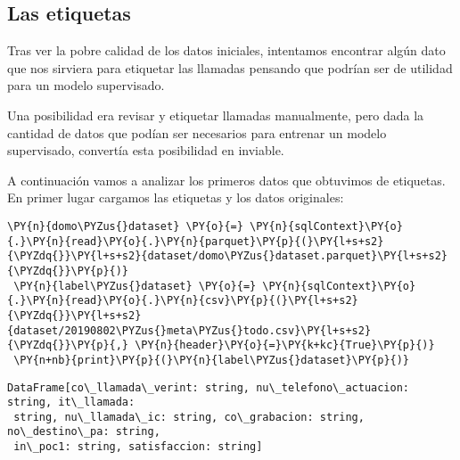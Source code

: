  
 \subsection{Las etiquetas}
 
 Tras ver la pobre calidad de los datos iniciales, intentamos encontrar algún dato que nos sirviera para etiquetar las llamadas pensando que podrían ser de utilidad para un modelo supervisado. 
 
 Una posibilidad era revisar y etiquetar llamadas manualmente, pero dada la cantidad de datos que podían ser necesarios para entrenar un modelo supervisado, convertía esta posibilidad en inviable.
 
 A continuación vamos a analizar los primeros datos que obtuvimos de etiquetas. En primer lugar cargamos las etiquetas y los datos originales:  
 \vspace{0.5cm}
 
   \begin{tcolorbox}[breakable, size=fbox, boxrule=1pt, pad at break*=1mm,colback=cellbackground, colframe=cellborder]
 \begin{Verbatim}[commandchars=\\\{\}]
 \PY{n}{domo\PYZus{}dataset} \PY{o}{=} \PY{n}{sqlContext}\PY{o}{.}\PY{n}{read}\PY{o}{.}\PY{n}{parquet}\PY{p}{(}\PY{l+s+s2}{\PYZdq{}}\PY{l+s+s2}{dataset/domo\PYZus{}dataset.parquet}\PY{l+s+s2}{\PYZdq{}}\PY{p}{)}
 \PY{n}{label\PYZus{}dataset} \PY{o}{=} \PY{n}{sqlContext}\PY{o}{.}\PY{n}{read}\PY{o}{.}\PY{n}{csv}\PY{p}{(}\PY{l+s+s2}{\PYZdq{}}\PY{l+s+s2}{dataset/20190802\PYZus{}meta\PYZus{}todo.csv}\PY{l+s+s2}{\PYZdq{}}\PY{p}{,} \PY{n}{header}\PY{o}{=}\PY{k+kc}{True}\PY{p}{)}
 \PY{n+nb}{print}\PY{p}{(}\PY{n}{label\PYZus{}dataset}\PY{p}{)}
 \end{Verbatim}
 \end{tcolorbox}
 
     \begin{Verbatim}[commandchars=\\\{\}]
 DataFrame[co\_llamada\_verint: string, nu\_telefono\_actuacion: string, it\_llamada:
 string, nu\_llamada\_ic: string, co\_grabacion: string, no\_destino\_pa: string,
 in\_poc1: string, satisfaccion: string]
     \end{Verbatim}
     
